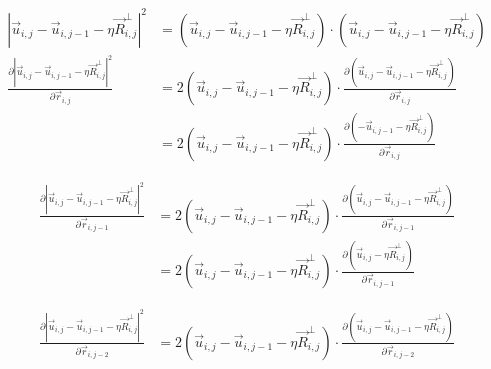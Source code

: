\documentclass{article}
\renewcommand{\ij}{_{i,j}}
\newcommand{\ijj}{_{i,j-1}}
\newcommand{\ijjj}{_{i,j-2}}
\newcommand{\magn}[1]{\left\vert #1 \right\vert }
\renewcommand{\part}[2]{\frac{\partial #1 }{\partial #2}}
\newcommand{\rij}{\vec{r} \ij}
\newcommand{\Rij}{\vec{R} \ij}
\newcommand{\rijj}{\vec{r} \ijj}
\newcommand{\rijjj}{\vec{r} \ijjj}
\newcommand{\uij}{\vec{u} \ij}
\newcommand{\uijj}{\vec{u} \ijj}
\begin{document}
\begin{align*}
  \magn{\uij - \uijj - \eta \Rij^\perp}^2 
  &=
  \left(\uij - \uijj - \eta \Rij^\perp\right)
  \cdot 
  \left(\uij - \uijj - \eta \Rij^\perp\right)
  \\
  \part{\magn{\uij - \uijj - \eta \Rij^\perp}^2 }{
    \rij 
  }
  &=
  2\left(\uij - \uijj - \eta \Rij^\perp\right) \cdot
  \part{\left(\uij - \uijj - \eta \Rij^\perp\right)}{\rij}
  \\
  &=
  2\left(\uij - \uijj - \eta \Rij^\perp\right) \cdot
  \part{\left(- \uijj - \eta \Rij^\perp\right)}{\rij}
\end{align*}


\begin{align*}
  \part{\magn{\uij - \uijj - \eta \Rij^\perp}^2 }{
    \rijj
  }
  &=
  2\left(\uij - \uijj - \eta \Rij^\perp\right) \cdot
  \part{\left(\uij - \uijj - \eta \Rij^\perp\right)}{\rijj}
  \\
  &=
  2\left(\uij - \uijj - \eta \Rij^\perp\right) \cdot
  \part{\left(\uij - \eta \Rij^\perp\right)}{\rijj}
\end{align*}


\begin{align*}
  \part{\magn{\uij - \uijj - \eta \Rij^\perp}^2 }{
    \rijjj
  }
  &=
  2\left(\uij - \uijj - \eta \Rij^\perp\right) \cdot
  \part{\left(\uij - \uijj - \eta \Rij^\perp\right)}{\rijjj}
\end{align*}
\end{document}
